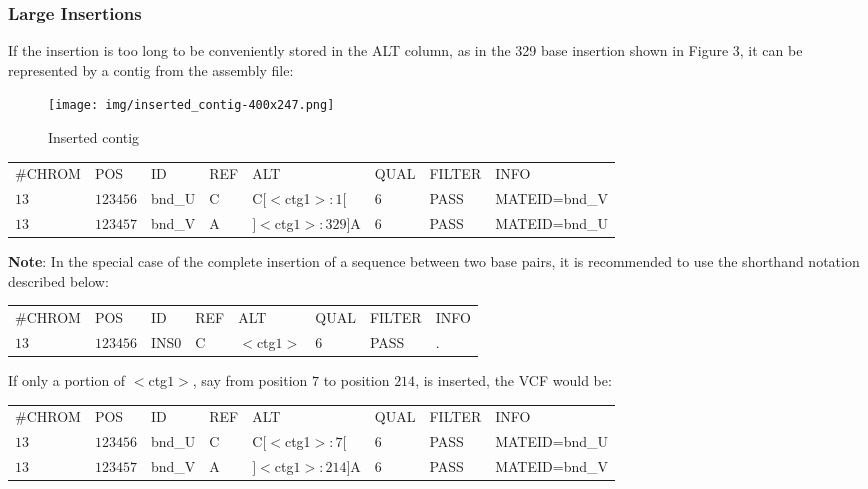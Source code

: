 \documentclass[8pt]{article}
\begin{document}
\subsubsection{Large Insertions}
If the insertion is too long to be conveniently stored in the ALT column, as in the 329 base insertion shown in Figure 3, it can be represented by a contig from the assembly file:

\begin{figure}[h]
\centering
\texttt{[image: img/inserted\_contig-400x247.png]}
\caption{Inserted contig}
\end{figure}

\vspace{0.3cm}
\small
\begin{tabular}{ l l l l l l l l }
\#CHROM & POS & ID & REF & ALT & QUAL & FILTER & INFO \\
$13$ & $123456$ & bnd\_U & C & C$[<$ctg1$>:1[$ & $6$ & PASS & MATEID=bnd\_V \\
$13$ & $123457$ & bnd\_V & A & $]<$ctg$1>:329]$A & $6$ & PASS & MATEID=bnd\_U \\
\end{tabular}
\normalsize
\vspace{0.3cm}

\textbf{Note}: In the special case of the complete insertion of a sequence between two base pairs, it is recommended to use the shorthand notation described below:

\vspace{0.3cm}
\begin{tabular}{ l l l l l l l l }
\#CHROM & POS & ID & REF & ALT & QUAL & FILTER & INFO \\
$13$ & $123456$ & INS0 & C & $<$ctg$1>$ & $6$ & PASS & . \\
\end{tabular}
\vspace{0.3cm}

If only a portion of $<$ctg$1>$, say from position $7$ to position $214$, is inserted, the VCF would be:
\par\nobreak
\vspace{0.3cm}
\small
\begin{tabular}{ l l l l l l l l }
\#CHROM & POS & ID & REF & ALT & QUAL & FILTER & INFO \\
$13$ & $123456$ & bnd\_U & C & C$[<$ctg1$>:7[$ & $6$ & PASS & MATEID=bnd\_U \\
$13$ & $123457$ & bnd\_V & A & $]<$ctg$1>:214]$A & $6$ & PASS & MATEID=bnd\_V \\
\end{tabular}
\normalsize
\vspace{0.3cm}
\end{document}
